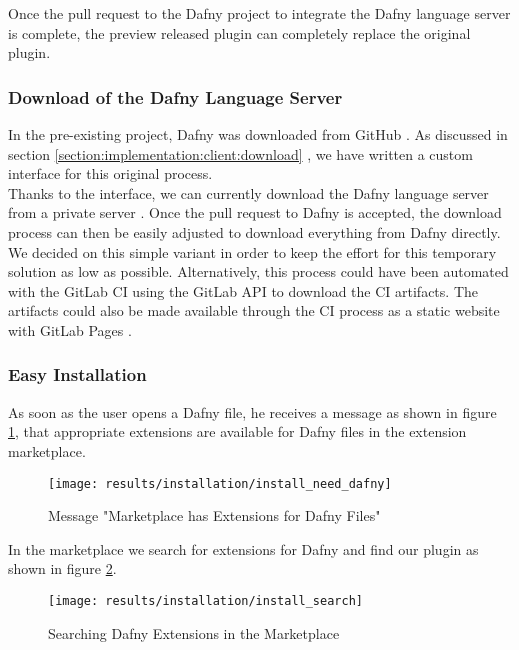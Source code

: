 Once the pull request to the Dafny project to integrate the Dafny language server is complete,
the preview released plugin can completely replace the original plugin.

\subsubsection{Download of the Dafny Language Server}
In the pre-existing project, Dafny was downloaded from GitHub \cite{dafny_lang_builds}.
As discussed in section \ref{section:implementation:client:download} \textendash{} ,
we have written a custom interface for this original process.\\

Thanks to the interface, we can currently download the Dafny language server from a private server \cite{client-serverStringResources}.
Once the pull request to Dafny is accepted, the download process can then be easily adjusted to download everything from Dafny directly.\\

We decided on this simple variant in order to keep the effort for this temporary solution as low as possible.
Alternatively, this process could have been automated with the GitLab CI using the GitLab API \cite{gitlab-api} to download the CI artifacts.  
The artifacts could also be made available through the CI process as a static website with GitLab Pages \cite{gitlab-pages}.

\subsubsection{Easy Installation}
As soon as the user opens a Dafny file, he receives a message as shown in figure \ref{fig:install_need_dafny},
that appropriate extensions are available for Dafny files in the extension marketplace.

\begin{figure}[H]
    \centering
    \texttt{[image: results/installation/install\_need\_dafny]}
    \caption{Message "Marketplace has Extensions for Dafny Files"}
    \label{fig:install_need_dafny}
\end{figure}

In the marketplace we search for extensions for Dafny and find our plugin as shown in figure \ref{fig:install_search}.

\begin{figure}[H]
    \centering
    \texttt{[image: results/installation/install\_search]}
    \caption{Searching Dafny Extensions in the Marketplace}
    \label{fig:install_search}
\end{figure}

